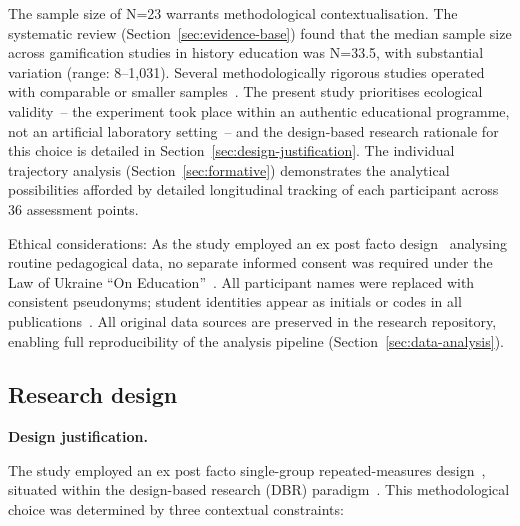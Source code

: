 The sample size of N=23 warrants methodological contextualisation. The systematic review (Section~\ref{sec:evidence-base}) found that the median sample size across gamification studies in history education was N=33.5, with substantial variation (range: 8--1,031). Several methodologically rigorous studies operated with comparable or smaller samples~\cite{Yin2018, CohenManionMorrison2018}. The present study prioritises ecological validity~-- the experiment took place within an authentic educational programme, not an artificial laboratory setting~-- and the design-based research rationale for this choice is detailed in Section~\ref{sec:design-justification}. The individual trajectory analysis (Section~\ref{sec:formative}) demonstrates the analytical possibilities afforded by detailed longitudinal tracking of each participant across 36 assessment points.

Ethical considerations: As the study employed an ex post facto design~\cite{creswell, ary} analysing routine pedagogical data, no separate informed consent was required under the Law of Ukraine ``On Education''~\cite{ZakonOsvita2017}. All participant names were replaced with consistent pseudonyms; student identities appear as initials or codes in all publications~\cite{CohenManionMorrison2018}. All original data sources are preserved in the research repository, enabling full reproducibility of the analysis pipeline (Section~\ref{sec:data-analysis}).

\subsection{Research design}

\textbf{Design justification.} \label{sec:design-justification}

The study employed an ex post facto single-group repeated-measures design~\cite{creswell, ary}, situated within the design-based research (DBR) paradigm~\cite{WangHannafin2005, AndersonShattuck2012, Bakker2018}. This methodological choice was determined by three contextual constraints:


